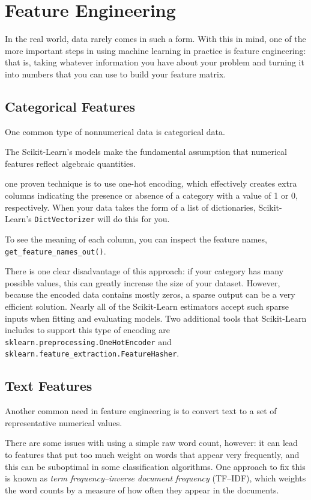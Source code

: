 \chapter{Feature Engineering\label{Ch40}}
In the real world, data rarely comes in such a form. With
this in mind, one of the more important steps in using machine learning in practice is
feature engineering: that is, taking whatever information you have about your problem
and turning it into numbers that you can use to build your feature matrix.
\section{Categorical Features}
One common type of nonnumerical data is categorical data.

The Scikit-Learn's models make the fundamental assumption that numerical features reflect algebraic quantities.

one proven technique is to use one-hot encoding, which effectively creates
extra columns indicating the presence or absence of a category with a value of 1 or 0,
respectively. When your data takes the form of a list of dictionaries, Scikit-Learn's
\verb|DictVectorizer| will do this for you.

To see the meaning of each column, you can inspect the feature names, \verb|get_feature_names_out()|.

There is one clear disadvantage of this approach: if your category has many possible
values, this can greatly increase the size of your dataset. However, because the encoded data contains mostly zeros, a sparse output can be a very efficient solution. Nearly all of the Scikit-Learn estimators accept such sparse inputs when fitting and
evaluating models. Two additional tools that Scikit-Learn includes to support this
type of encoding are \verb|sklearn.preprocessing.OneHotEncoder| and \verb|sklearn.feature_extraction.FeatureHasher|.

\section{Text Features}
Another common need in feature engineering is to convert text to a set of representative numerical values.


There are some issues with using a simple raw word count, however: it can lead to
features that put too much weight on words that appear very frequently, and this can
be suboptimal in some classification algorithms. One approach to fix this is known as
\textit{term frequency–inverse document frequency} (TF–IDF), which weights the word counts
by a measure of how often they appear in the documents.


